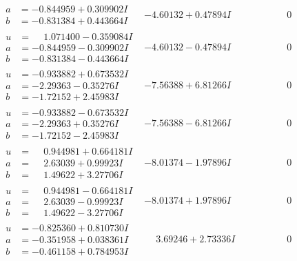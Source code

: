 \documentclass[1p]{elsarticle_modified}
\theoremstyle{definition}
\begin{document}
$$\begin{array}{c|c|c}
\begin{aligned}
a &= -0.844959 + 0.309902 I \\
b &= -0.831384 + 0.443664 I\end{aligned}
 & -4.60132 + 0.47894 I & \phantom{-0.000000 } 0 \\ \hline\begin{aligned}
u &= \phantom{-}1.071400 - 0.359084 I \\
a &= -0.844959 - 0.309902 I \\
b &= -0.831384 - 0.443664 I\end{aligned}
 & -4.60132 - 0.47894 I & \phantom{-0.000000 } 0 \\ \hline\begin{aligned}
u &= -0.933882 + 0.673532 I \\
a &= -2.29363 - 0.35276 I \\
b &= -1.72152 + 2.45983 I\end{aligned}
 & -7.56388 + 6.81266 I & \phantom{-0.000000 } 0 \\ \hline\begin{aligned}
u &= -0.933882 - 0.673532 I \\
a &= -2.29363 + 0.35276 I \\
b &= -1.72152 - 2.45983 I\end{aligned}
 & -7.56388 - 6.81266 I & \phantom{-0.000000 } 0 \\ \hline\begin{aligned}
u &= \phantom{-}0.944981 + 0.664181 I \\
a &= \phantom{-}2.63039 + 0.99923 I \\
b &= \phantom{-}1.49622 + 3.27706 I\end{aligned}
 & -8.01374 - 1.97896 I & \phantom{-0.000000 } 0 \\ \hline\begin{aligned}
u &= \phantom{-}0.944981 - 0.664181 I \\
a &= \phantom{-}2.63039 - 0.99923 I \\
b &= \phantom{-}1.49622 - 3.27706 I\end{aligned}
 & -8.01374 + 1.97896 I & \phantom{-0.000000 } 0 \\ \hline\begin{aligned}
u &= -0.825360 + 0.810730 I \\
a &= -0.351958 + 0.038361 I \\
b &= -0.461158 + 0.784953 I\end{aligned}
 & \phantom{-}3.69246 + 2.73336 I & \phantom{-0.000000 } 0 \\ \hline\begin{aligned}

\end{aligned}
\end{array}$$
\end{document}
